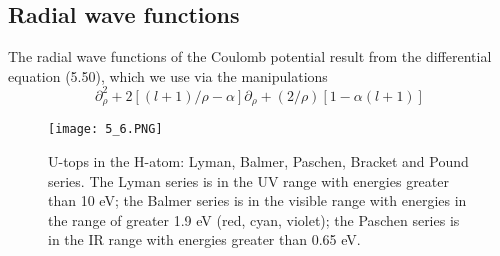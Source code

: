\subsection{Radial wave functions}
The radial wave functions of the Coulomb potential result from the differential equation (5.50), which we use via the manipulations
\begin{equation}
    \partial_{\rho}^{2}+2[(l+1) / \rho-\alpha] \partial_{\rho}+(2 / \rho)[1-\alpha(l+1)]
    \end{equation}
\begin{figure}[ht]
    \centering
    \texttt{[image: 5\_6.PNG]}
    \caption{U-tops in the H-atom: Lyman, Balmer, Paschen, Bracket and Pound series. The Lyman series is in the UV range with energies greater than 10 eV; the Balmer series is in the visible range with energies in the range of greater 1.9 eV (red, cyan, violet); the Paschen series is in the IR range with energies greater than 0.65 eV.}
\end{figure}

